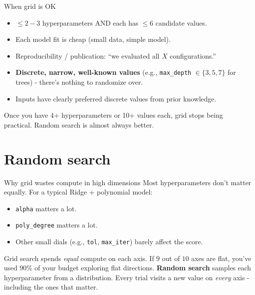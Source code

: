\documentclass[aspectratio=169]{beamer}
\begin{document}
\begin{frame}{When grid is OK}
  \begin{itemize}
    \item $\leq 2{-}3$ hyperparameters AND each has $\leq 6$ candidate values.
    \item Each model fit is cheap (small data, simple model).
    \item Reproducibility / publication: ``we evaluated all $X$ configurations.''
    \item \textbf{Discrete, narrow, well-known values} (e.g., \texttt{max\_depth} $\in \{3, 5, 7\}$ for trees) - there's nothing to randomize over.
    \item Inputs have clearly preferred discrete values from prior knowledge.
  \end{itemize}
  \vfill
  Once you have 4+ hyperparameters or 10+ values each, grid stops being practical. Random search is almost always better.
\end{frame}

\section{Random search}

\begin{frame}{Why grid wastes compute in high dimensions}
  Most hyperparameters don't matter equally. For a typical Ridge + polynomial model:
  \begin{itemize}
    \item \texttt{alpha} matters a lot.
    \item \texttt{poly\_degree} matters a lot.
    \item Other small dials (e.g., \texttt{tol}, \texttt{max\_iter}) barely affect the score.
  \end{itemize}
  \vfill
  Grid search spends \emph{equal} compute on each axis. If $9$ out of $10$ axes are flat, you've used 90\% of your budget exploring flat directions.
  \vfill
  \textbf{Random search} samples each hyperparameter from a distribution. Every trial visits a new value on \emph{every} axis - including the ones that matter.
\end{frame}
\end{document}

